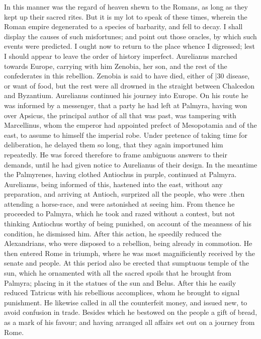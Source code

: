 In this manner was the regard of heaven shewn to the Romans, as long as they kept up their sacred rites. But it is my lot to speak of these times, wherein the Roman empire degenerated to a species of barbarity, and fell to decay. I shall display the causes of such misfortunes; and point out those oracles, by which such events were predicted. I ought now to return to the place whence I digressed; lest I should appear to leave the order of history imperfect. Aurelianus marched towards Europe, carrying with him Zenobia, her son, and the rest of the confederates in this rebellion. Zenobia is said to have died, either of
|30 disease, or want of food, but the rest were all drowned in the straight between Chalcedon and Byzantium. Aurelianus continued his journey into Europe. On his route he was informed by a messenger, that a party he had left at Palmyra, having won over Apsicus, the principal author of all that was past, was tampering with Marcellinus, whom the emperor had appointed prefect of Mesopotamia and of the east, to assume to himself the imperial robe. Under pretence of taking time for deliberation, he delayed them so long, that they again importuned him repeatedly. He was forced therefore to frame ambiguous answers to their demands, until he had given notice to Aurelianus of their design. In the meantime the Palmyrenes, having clothed Antiochus in purple, continued at Palmyra. Aurelianus, being informed of this, hastened into the east, without any preparation, and arriving at Antioch, surprized all the people, who were .then attending a horse-race, and were astonished at seeing him. From thence he proceeded to Palmyra, which he took and razed without a contest, but not thinking Antiochus worthy of being punished, on account of the meanness of his condition, he dismissed him. After this action, he speedily reduced the Alexandrians, who were disposed to a rebellion, being already in commotion. He then entered Rome in triumph, where he was most magnificiently received by the senate and people. At this period also be erected that sumptuous temple of the sun, which he ornamented with all the sacred spoils that he brought from Palmyra; placing in it the statues of the sun and Belus. After this he easily reduced Tatricus with his rebellious accomplices, whom he brought to signal punishment. He likewise called in all the counterfeit money, and issued new, to avoid confusion in trade. Besides which he bestowed on the people a gift of bread, as a mark of his favour; and having arranged all affairs set out on a journey from Rome.

